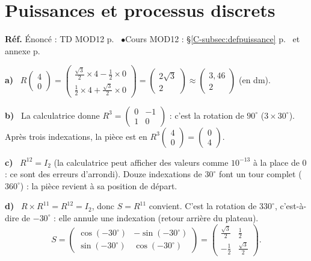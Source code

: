 \documentclass[a4paper,11pt]{article}
\newcommand{\M}[1]{\begin{pmatrix}#1\end{pmatrix}}
\newcommand{\cours}[1]{§\ref{C-#1} p.~\pageref{C-#1}}
\newcommand{\source}[2]{{\footnotesize\color{uimmgray}\textbf{Réf.} \enspace Énoncé : TD MOD12 p.~\pageref{T-#1} \enspace$\bullet$\enspace Cours MOD12 : #2}\par\smallskip}
\newcommand{\annexe}[1]{annexe p.~\pageref{C-#1}}
\newcommand{\q}[1]{\textbf{\color{uimmblue}#1}\ }
\begin{document}
\needspace{8cm}
\section{Puissances et processus discrets}

\begin{correction}
\source{exo:8}{\cours{subsec:defpuissance} et \annexe{fiche:calc}}
\q{a)} $R\M{4\\0} = \M{\frac{\sqrt 3}{2}\times 4 - \frac12\times 0\\[2pt] \frac12\times 4 + \frac{\sqrt 3}{2}\times 0} = \M{2\sqrt 3\\ 2}\approx\M{3{,}46\\ 2}$ (en dm).

\q{b)} La calculatrice donne $R^3 = \M{0 & -1\\ 1 & 0}$ : c'est la rotation de $90^\circ$ ($3\times 30^\circ$). Après trois indexations, la pièce est en $R^3\M{4\\0} = \M{0\\4}$.

\q{c)} $R^{12} = I_2$ (la calculatrice peut afficher des valeurs comme $10^{-13}$ à la place de $0$ : ce sont des erreurs d'arrondi). Douze indexations de $30^\circ$ font un tour complet ($360^\circ$) : la pièce revient à sa position de départ.

\q{d)} $R\times R^{11} = R^{12} = I_2$, donc $S = R^{11}$ convient. C'est la rotation de $330^\circ$, c'est-à-dire de $-30^\circ$ : elle annule une indexation (retour arrière du plateau).
\[
S = \M{\cos(-30^\circ) & -\sin(-30^\circ)\\ \sin(-30^\circ) & \cos(-30^\circ)} = \M{\frac{\sqrt3}{2} & \frac12\\[2pt] -\frac12 & \frac{\sqrt3}{2}}.
\]
\end{correction}
\end{document}
